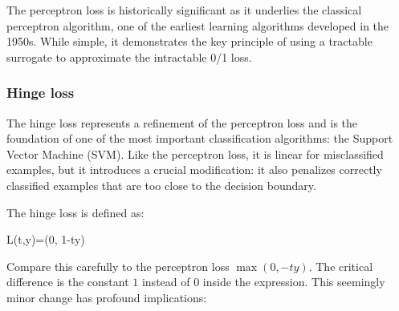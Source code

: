 \begin{center}
\end{center}

The perceptron loss is historically significant as it underlies the classical perceptron algorithm, one of the earliest learning algorithms developed in the 1950s. While simple, it demonstrates the key principle of using a tractable surrogate to approximate the intractable 0/1 loss.

\subsubsection*{Hinge loss}

The \alert{hinge loss} represents a refinement of the perceptron loss and is the foundation of one of the most important classification algorithms: the Support Vector Machine (SVM). Like the perceptron loss, it is linear for misclassified examples, but it introduces a crucial modification: it also penalizes correctly classified examples that are too close to the decision boundary.

The hinge loss is defined as:
\begin{myequation}
L(t,y)=\max(0, 1-ty)
\end{myequation}

Compare this carefully to the perceptron loss $\max(0, -ty)$. The critical difference is the constant $1$ instead of $0$ inside the expression. This seemingly minor change has profound implications:


